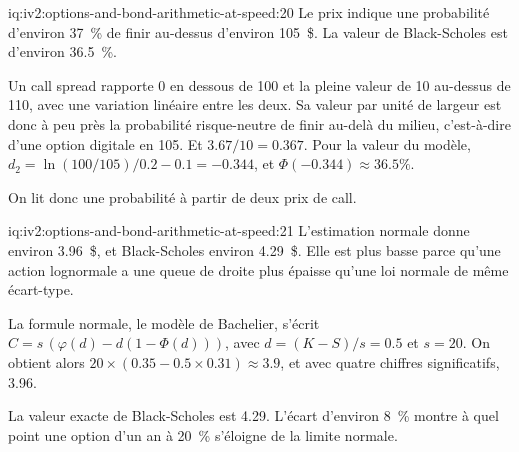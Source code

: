 \begin{solution}{iq:iv2:options-and-bond-arithmetic-at-speed:20}
Le prix indique une probabilité d'environ 37~\% de finir au-dessus d'environ 105~\$. La valeur de Black-Scholes est d'environ 36.5~\%.

Un call spread rapporte 0 en dessous de 100 et la pleine valeur de 10 au-dessus de 110, avec une variation linéaire entre les deux. Sa valeur par unité de largeur est donc à peu près la probabilité risque-neutre de finir au-delà du milieu, c'est-à-dire d'une option digitale en 105. Et $3.67/10 = 0.367$. Pour la valeur du modèle, $d_2 = \ln(100/105)/0.2 - 0.1 = -0.344$, et $\Phi(-0.344) \approx 36.5\%$.

On lit donc une probabilité à partir de deux prix de call.

\end{solution}

\begin{solution}{iq:iv2:options-and-bond-arithmetic-at-speed:21}
L'estimation normale donne environ 3.96~\$, et Black-Scholes environ 4.29~\$. Elle est plus basse parce qu'une action lognormale a une queue de droite plus épaisse qu'une loi normale de même écart-type.

La formule normale, le modèle de Bachelier, s'écrit $C = s\,(\varphi(d) - d(1 - \Phi(d)))$, avec $d = (K - S)/s = 0.5$ et $s = 20$. On obtient alors $20 \times (0.35 - 0.5 \times 0.31) \approx 3.9$, et avec quatre chiffres significatifs, 3.96.

La valeur exacte de Black-Scholes est 4.29. L'écart d'environ 8~\% montre à quel point une option d'un an à 20~\% s'éloigne de la limite normale.

\end{solution}

